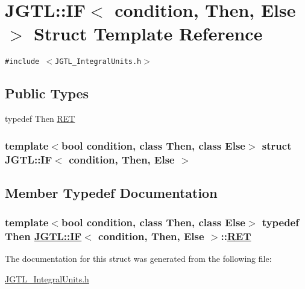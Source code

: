 \hypertarget{struct_j_g_t_l_1_1_i_f}{
\section{JGTL::IF$<$ condition, Then, Else $>$ Struct Template Reference}
\label{struct_j_g_t_l_1_1_i_f}
}
{\tt \#include $<$JGTL\_\-Integral\-Units.h$>$}

\subsection*{Public Types}
\begin{CompactItemize}
\item 
typedef Then \hyperlink{struct_j_g_t_l_1_1_i_f_e76ae6dfccd5d4c23b2d079f1a6a3b87}{RET}
\end{CompactItemize}
\subsubsection*{template$<$bool condition, class Then, class Else$>$ struct JGTL::IF$<$ condition, Then, Else $>$}



\subsection{Member Typedef Documentation}
\hypertarget{struct_j_g_t_l_1_1_i_f_e76ae6dfccd5d4c23b2d079f1a6a3b87}{
\subsubsection[RET]{\setlength{\rightskip}{0pt plus 5cm}template$<$bool condition, class Then, class Else$>$ typedef Then \hyperlink{struct_j_g_t_l_1_1_i_f}{JGTL::IF}$<$ condition, Then, Else $>$::\hyperlink{struct_j_g_t_l_1_1_i_f_e76ae6dfccd5d4c23b2d079f1a6a3b87}{RET}}}
\label{struct_j_g_t_l_1_1_i_f_e76ae6dfccd5d4c23b2d079f1a6a3b87}




The documentation for this struct was generated from the following file:\begin{CompactItemize}
\item 
\hyperlink{_j_g_t_l___integral_units_8h}{JGTL\_\-Integral\-Units.h}\end{CompactItemize}
